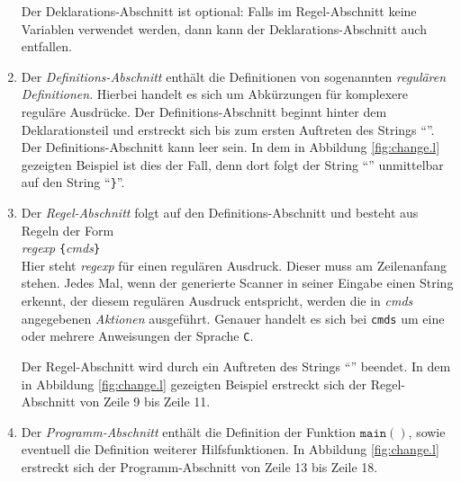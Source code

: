 \begin{enumerate}
      Der Deklarations-Abschnitt ist optional: Falls im Regel-Abschnitt keine Variablen
      verwendet werden, dann kann der Deklarations-Abschnitt auch entfallen.
\item Der \emph{Definitions-Abschnitt} enth\"alt die Definitionen von sogenannten \emph{regul\"aren Definitionen}.
      Hierbei handelt es sich um Abk\"urzungen f\"ur komplexere regul\"are Ausdr\"ucke.
      Der Definitions-Abschnitt beginnt hinter dem Deklarationsteil und erstreckt sich bis zum
      ersten Auftreten des Strings ``\texttt{}''.
      Der Definitions-Abschnitt kann leer sein.  In dem in Abbildung \ref{fig:change.l}
      gezeigten Beispiel ist dies der Fall, denn dort folgt der String
      ``\texttt{}'' unmittelbar auf den String ``\texttt{\}}''.
\item Der \emph{Regel-Abschnitt} folgt auf den Definitions-Abschnitt und besteht aus Regeln
      der Form
      \\[0.2cm]
      \hspace*{1.3cm} \textsl{regexp} \texttt{\{}\textsl{cmds}\texttt{\}}
      \\[0.2cm]
      Hier steht \textsl{regexp}\/ f\"ur einen regul\"aren Ausdruck. Dieser muss am Zeilenanfang
      stehen.  Jedes Mal, wenn der generierte Scanner in seiner Eingabe einen String
      erkennt, der diesem regul\"aren Ausdruck entspricht, werden die in \textsl{cmds}\/
      angegebenen \emph{Aktionen} ausgef\"uhrt.  Genauer handelt es sich bei \texttt{cmds} um eine
      oder mehrere Anweisungen der Sprache \texttt{C}.

      Der Regel-Abschnitt wird durch ein Auftreten des Strings
      ``\texttt{}''
      beendet.  In dem in Abbildung \ref{fig:change.l}
      gezeigten Beispiel erstreckt sich der Regel-Abschnitt von Zeile 9 bis Zeile 11.
\item Der \emph{Programm-Abschnitt} enth\"alt die Definition der Funktion $\texttt{main}()$,
      sowie eventuell die Definition weiterer Hilfsfunktionen.
      In Abbildung \ref{fig:change.l} erstreckt sich der Programm-Abschnitt von Zeile 13
      bis Zeile 18.
\end{enumerate}

